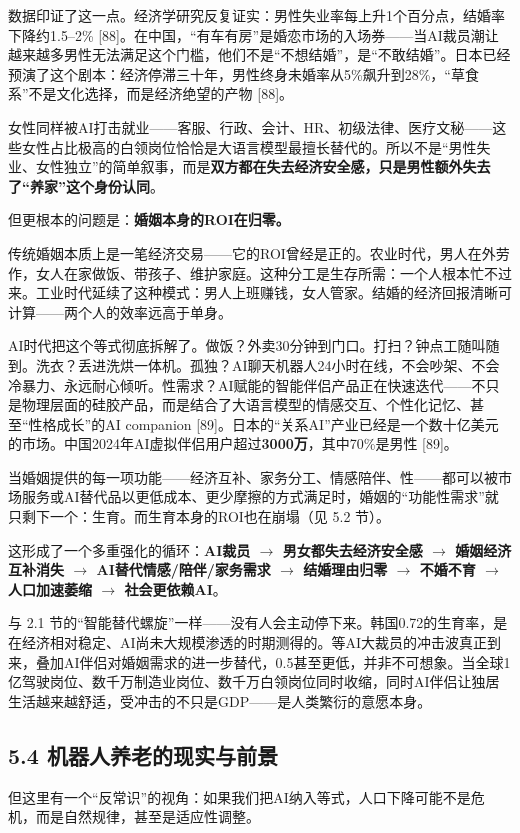 \documentclass[11pt,a4paper]{ctexart}
\begin{document}
数据印证了这一点。经济学研究反复证实：男性失业率每上升1个百分点，结婚率下降约1.5--2\% [88]。在中国，“有车有房”是婚恋市场的入场券——当AI裁员潮让越来越多男性无法满足这个门槛，他们不是“不想结婚”，是“不敢结婚”。日本已经预演了这个剧本：经济停滞三十年，男性终身未婚率从5\%飙升到28\%，“草食系”不是文化选择，而是经济绝望的产物 [88]。

女性同样被AI打击就业——客服、行政、会计、HR、初级法律、医疗文秘——这些女性占比极高的白领岗位恰恰是大语言模型最擅长替代的。所以不是“男性失业、女性独立”的简单叙事，而是\textbf{双方都在失去经济安全感，只是男性额外失去了“养家”这个身份认同}。

但更根本的问题是：\textbf{婚姻本身的ROI在归零。}

传统婚姻本质上是一笔经济交易——它的ROI曾经是正的。农业时代，男人在外劳作，女人在家做饭、带孩子、维护家庭。这种分工是生存所需：一个人根本忙不过来。工业时代延续了这种模式：男人上班赚钱，女人管家。结婚的经济回报清晰可计算——两个人的效率远高于单身。

AI时代把这个等式彻底拆解了。做饭？外卖30分钟到门口。打扫？钟点工随叫随到。洗衣？丢进洗烘一体机。孤独？AI聊天机器人24小时在线，不会吵架、不会冷暴力、永远耐心倾听。性需求？AI赋能的智能伴侣产品正在快速迭代——不只是物理层面的硅胶产品，而是结合了大语言模型的情感交互、个性化记忆、甚至“性格成长”的AI companion [89]。日本的“关系AI”产业已经是一个数十亿美元的市场。中国2024年AI虚拟伴侣用户超过\textbf{3000万}，其中70\%是男性 [89]。

当婚姻提供的每一项功能——经济互补、家务分工、情感陪伴、性——都可以被市场服务或AI替代品以更低成本、更少摩擦的方式满足时，婚姻的“功能性需求”就只剩下一个：生育。而生育本身的ROI也在崩塌（见 5.2 节）。

这形成了一个多重强化的循环：\textbf{AI裁员 $\to$ 男女都失去经济安全感 $\to$ 婚姻经济互补消失 $\to$ AI替代情感/陪伴/家务需求 $\to$ 结婚理由归零 $\to$ 不婚不育 $\to$ 人口加速萎缩 $\to$ 社会更依赖AI}。

与 2.1 节的“智能替代螺旋”一样——没有人会主动停下来。韩国0.72的生育率，是在经济相对稳定、AI尚未大规模渗透的时期测得的。等AI大裁员的冲击波真正到来，叠加AI伴侣对婚姻需求的进一步替代，0.5甚至更低，并非不可想象。当全球1亿驾驶岗位、数千万制造业岗位、数千万白领岗位同时收缩，同时AI伴侣让独居生活越来越舒适，受冲击的不只是GDP——是人类繁衍的意愿本身。

\subsection{5.4 机器人养老的现实与前景}

但这里有一个“反常识”的视角：如果我们把AI纳入等式，人口下降可能不是危机，而是自然规律，甚至是适应性调整。
\end{document}
